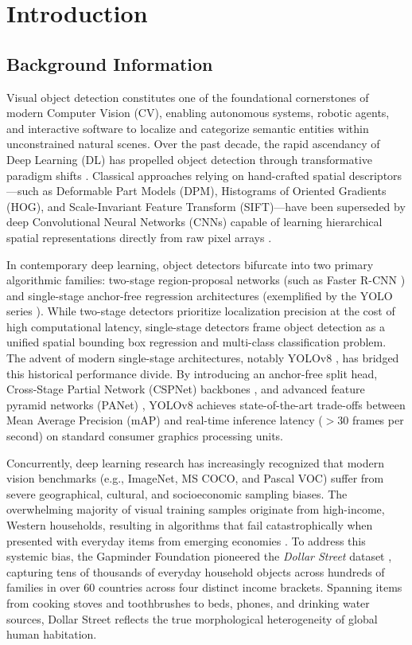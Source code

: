 \chapter{Introduction}
\label{chap:introduction}

\section{Background Information}
\label{sec:background}

Visual object detection constitutes one of the foundational cornerstones of modern Computer Vision (CV), enabling autonomous systems, robotic agents, and interactive software to localize and categorize semantic entities within unconstrained natural scenes. Over the past decade, the rapid ascendancy of Deep Learning (DL) has propelled object detection through transformative paradigm shifts \cite{lecun2015deep}. Classical approaches relying on hand-crafted spatial descriptors---such as Deformable Part Models (DPM), Histograms of Oriented Gradients (HOG), and Scale-Invariant Feature Transform (SIFT)---have been superseded by deep Convolutional Neural Networks (CNNs) capable of learning hierarchical spatial representations directly from raw pixel arrays \cite{he2016deep}.

In contemporary deep learning, object detectors bifurcate into two primary algorithmic families: two-stage region-proposal networks (such as Faster R-CNN \cite{ren2015faster}) and single-stage anchor-free regression architectures (exemplified by the YOLO series \cite{redmon2016you, jocher2023ultralytics}). While two-stage detectors prioritize localization precision at the cost of high computational latency, single-stage detectors frame object detection as a unified spatial bounding box regression and multi-class classification problem. The advent of modern single-stage architectures, notably YOLOv8 \cite{jocher2023ultralytics}, has bridged this historical performance divide. By introducing an anchor-free split head, Cross-Stage Partial Network (CSPNet) backbones \cite{wang2020cspnet}, and advanced feature pyramid networks (PANet) \cite{liu2018path}, YOLOv8 achieves state-of-the-art trade-offs between Mean Average Precision (mAP) and real-time inference latency ($>30$ frames per second) on standard consumer graphics processing units.

Concurrently, deep learning research has increasingly recognized that modern vision benchmarks (e.g., ImageNet, MS COCO, and Pascal VOC) suffer from severe geographical, cultural, and socioeconomic sampling biases. The overwhelming majority of visual training samples originate from high-income, Western households, resulting in algorithms that fail catastrophically when presented with everyday items from emerging economies \cite{shankar2021no}. To address this systemic bias, the Gapminder Foundation pioneered the \textit{Dollar Street} dataset \cite{rojas2021dollar}, capturing tens of thousands of everyday household objects across hundreds of families in over 60 countries across four distinct income brackets. Spanning items from cooking stoves and toothbrushes to beds, phones, and drinking water sources, Dollar Street reflects the true morphological heterogeneity of global human habitation.

